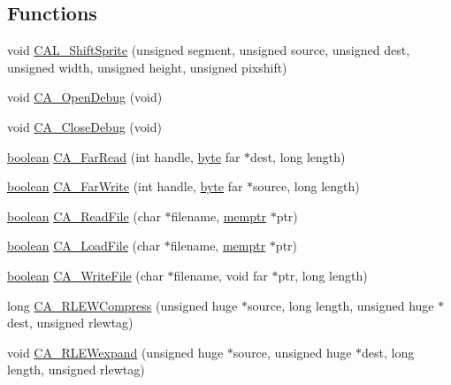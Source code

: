 \subsection*{Functions}
\begin{DoxyCompactItemize}
\item 
void \hyperlink{ID__CA_8H_a1f654d816c0249d16166cf130e02a480}{CAL\_\-ShiftSprite} (unsigned segment, unsigned source, unsigned dest, unsigned width, unsigned height, unsigned pixshift)
\item 
void \hyperlink{ID__CA_8H_a9094160617fdfa866053f3b4a8387dc9}{CA\_\-OpenDebug} (void)
\item 
void \hyperlink{ID__CA_8H_a72ac49cbfaaa2ed17141f17e50b30558}{CA\_\-CloseDebug} (void)
\item 
\hyperlink{ID__HEAD_8H_a7c6368b321bd9acd0149b030bb8275ed}{boolean} \hyperlink{ID__CA_8H_a9d7ef0e3d4f10f25abd940094a4db437}{CA\_\-FarRead} (int handle, \hyperlink{ID__HEAD_8H_a0c8186d9b9b7880309c27230bbb5e69d}{byte} far $\ast$dest, long length)
\item 
\hyperlink{ID__HEAD_8H_a7c6368b321bd9acd0149b030bb8275ed}{boolean} \hyperlink{ID__CA_8H_a2577d7c247ebeb91941abed324b1035b}{CA\_\-FarWrite} (int handle, \hyperlink{ID__HEAD_8H_a0c8186d9b9b7880309c27230bbb5e69d}{byte} far $\ast$source, long length)
\item 
\hyperlink{ID__HEAD_8H_a7c6368b321bd9acd0149b030bb8275ed}{boolean} \hyperlink{ID__CA_8H_a4ec80fcd3a66374c4253d51b4fada60d}{CA\_\-ReadFile} (char $\ast$filename, \hyperlink{ID__MM_8H_a04062decc7eb282b066c65e9137bb9bf}{memptr} $\ast$ptr)
\item 
\hyperlink{ID__HEAD_8H_a7c6368b321bd9acd0149b030bb8275ed}{boolean} \hyperlink{ID__CA_8H_a99379c81fecc0c0c0c1873f839f1116f}{CA\_\-LoadFile} (char $\ast$filename, \hyperlink{ID__MM_8H_a04062decc7eb282b066c65e9137bb9bf}{memptr} $\ast$ptr)
\item 
\hyperlink{ID__HEAD_8H_a7c6368b321bd9acd0149b030bb8275ed}{boolean} \hyperlink{ID__CA_8H_a1f669cb7875ea0acf136824a1fa1d60f}{CA\_\-WriteFile} (char $\ast$filename, void far $\ast$ptr, long length)
\item 
long \hyperlink{ID__CA_8H_a5ecb19a0976eb7cc7ebc0636ff16ef6f}{CA\_\-RLEWCompress} (unsigned huge $\ast$source, long length, unsigned huge $\ast$dest, unsigned rlewtag)
\item 
void \hyperlink{ID__CA_8H_a8147c0afc9dd7263e43e2499d58782b7}{CA\_\-RLEWexpand} (unsigned huge $\ast$source, unsigned huge $\ast$dest, long length, unsigned rlewtag)
\item 

\end{DoxyCompactItemize}
